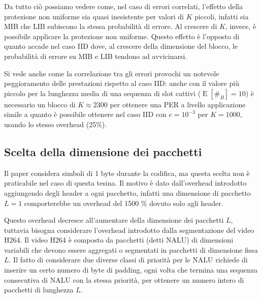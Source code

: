 \documentclass[italian, a4paper, 12pt]{article}
\newcommand{\E}[1]{\operatorname{E}\left[#1\right]}
\newcommand{\EnB}{\E{\#_B}}
\begin{document}
Da tutto ciò possiamo vedere come, nel caso di errori correlati,
l'effetto della protezione non uniforme sia quasi inesistente per
valori di $K$ piccoli, infatti sia MIB che LIB subiscono la stessa
probabilità di errore. Al crescere di $K$, invece, è possibile
applicare la protezione non uniforme.
%
Questo effetto è l'opposto di quanto accade nel caso IID \cite{uep}
dove, al crescere della dimensione del blocco, le probabilità di
errore su MIB e LIB tendono ad avvicinarsi.

Si vede anche come la correlazione tra gli errori provochi un notevole
peggioramento delle prestazioni rispetto al caso IID: anche con il
valore più piccolo per la lunghezza media di una sequenza di slot
cattivi ($\EnB = 10$) è necessario un blocco di $K\approx 2300$ per
ottenere una PER a livello applicazione simile a quanto è possibile
ottenere nel caso IID con $e=10^{-3}$ per $K=1000$, usando lo stesso
overhead (25\%).

\subsection{Scelta della dimensione dei pacchetti}
\label{sec:pktsize}
Il paper \cite{uep} considera simboli di 1 byte durante la codifica,
ma questa scelta non è praticabile nel caso di questa tesina. Il
motivo è dato dall'overhead introdotto aggiungendo degli header a ogni
pacchetto, infatti una dimensione di pacchetto $L=1$ comporterebbe un
overhead del 1500 \% dovuto solo agli header.

Questo overhead decresce all'aumentare della dimensione dei pacchetti
$L$, tuttavia bisogna considerare l'overhead introdotto dalla
segmentazione del video H264.
%
Il video H264 è composto da pacchetti (detti NALU) di dimensioni
variabili che devono essere aggregati o segmentati in pacchetti di
dimensione fissa $L$. Il fatto di considerare due diverse classi di
priorità per le NALU richiede di inserire un certo numero di byte di
padding, ogni volta che termina una sequenza consecutiva di NALU con
la stessa priorità, per ottenere un numero intero di pacchetti di
lunghezza $L$.
\end{document}

